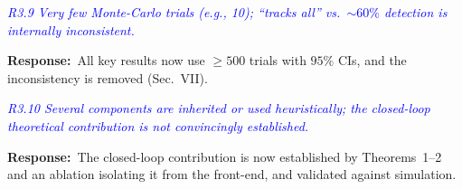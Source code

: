 \documentclass[11pt]{article}
\newcommand{\rc}[1]{\textit{\textcolor{blue}{#1}}}      %
\newcommand{\reply}{\par\noindent\textbf{Response:}\ }
\begin{document}
\rc{R3.9 Very few Monte-Carlo trials (e.g., 10); ``tracks all'' vs.\ $\sim60\%$
detection is internally inconsistent.}
\reply All key results now use $\geq500$ trials with $95\%$ CIs, and the
inconsistency is removed (Sec.~VII).

\rc{R3.10 Several components are inherited or used heuristically; the closed-loop
theoretical contribution is not convincingly established.}
\reply The closed-loop contribution is now established by Theorems~1--2 and an
ablation isolating it from the front-end, and validated against simulation.
\end{document}
